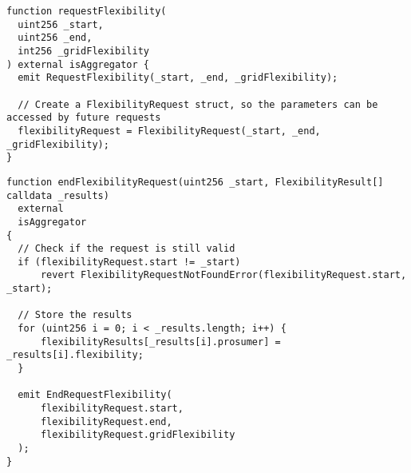 \begin{verbatim}
function requestFlexibility(
  uint256 _start,
  uint256 _end,
  int256 _gridFlexibility
) external isAggregator {
  emit RequestFlexibility(_start, _end, _gridFlexibility);

  // Create a FlexibilityRequest struct, so the parameters can be accessed by future requests
  flexibilityRequest = FlexibilityRequest(_start, _end, _gridFlexibility);
}
\end{verbatim}

\begin{verbatim}
function endFlexibilityRequest(uint256 _start, FlexibilityResult[] calldata _results)
  external
  isAggregator
{   
  // Check if the request is still valid
  if (flexibilityRequest.start != _start)
      revert FlexibilityRequestNotFoundError(flexibilityRequest.start, _start);

  // Store the results
  for (uint256 i = 0; i < _results.length; i++) {
      flexibilityResults[_results[i].prosumer] = _results[i].flexibility;
  }

  emit EndRequestFlexibility(
      flexibilityRequest.start,
      flexibilityRequest.end,
      flexibilityRequest.gridFlexibility
  );
}
\end{verbatim}

